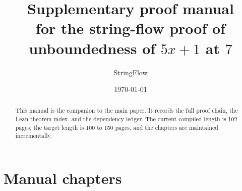 \documentclass[11pt]{article}
\title{Supplementary proof manual\\ for the string-flow proof of unboundedness of $5x+1$ at $7$}
\author{StringFlow}
\date{\today}
\theoremstyle{plain}
\begin{document}
\sloppy

\maketitle

\begin{abstract}
This manual is the companion to the main paper.  It records the full
proof chain, the Lean theorem index, and the dependency ledger.  The
current compiled length is 102 pages; the target length is 100 to 150
pages, and the chapters are maintained incrementally.
\end{abstract}

\tableofcontents



































\section{Manual chapters}
\end{document}
